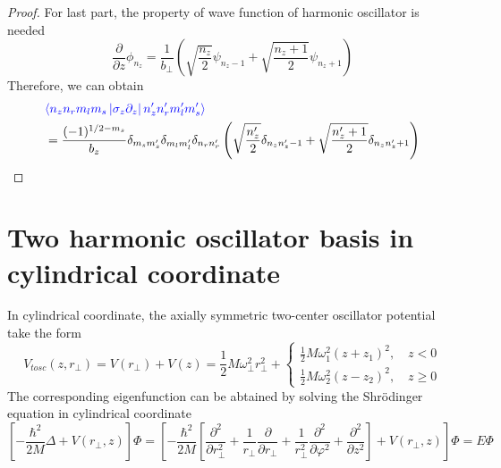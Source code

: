 \begin{proof}
For last part, the property of wave function of harmonic oscillator is needed
\begin{equation}
  \frac{\partial}{\partial z} \phi_{n_z} = \frac{1}{b_\perp} \left( \sqrt{\frac{n_z}{2}}\psi_{n_z -1} + \sqrt{\frac{n_z + 1}{2}} \psi_{n_z + 1} \right)
\end{equation}
Therefore, we can obtain
\begin{equation}
  \begin{aligned}
    &\textcolor{blue}{\left\langle n_z n_r m_l m_s \left| \sigma_z \partial_z \right| n_z^{\prime} n_r^{\prime} m_l^{\prime} m_s^{\prime} \right\rangle}\\
    &=\frac{(-1)^{1 / 2-m_{s}}}{b_{z}} \delta_{m_{s} m_{s}^{\prime}} \delta_{m_{l} m_{l}^{\prime}} \delta_{n_{r} n_{r}^{\prime}}\left(\sqrt{\frac{n_{z}^{\prime}}{2}} \delta_{n_{z} n_{z}^{\prime}-1}+\sqrt{\frac{n_{z}^{\prime}+1}{2}} \delta_{n_{z} n_{z}^{\prime}+1}\right)
  \end{aligned}
\end{equation}
\end{proof}

\section{Two harmonic oscillator basis in cylindrical coordinate}

In cylindrical coordinate, the axially symmetric two-center oscillator potential take the form
\begin{equation}
V_{tosc}(z, r_\perp) = V(r_\perp) + V(z) = \frac{1}{2} M \omega_\perp^2 r_\perp^2 + 
\begin{cases}
  \frac{1}{2} M \omega_1^2(z + z_1)^2, \quad  z<0\\
  \frac{1}{2} M \omega_2^2(z - z_2)^2, \quad  z \geqslant 0
\end{cases}
\end{equation}
The corresponding eigenfunction can be abtained by solving the Shr{\"o}dinger equation in cylindrical coordinate
\begin{equation}
\left[-\frac{\hbar^{2}}{2 M} \Delta+V\left(r_{\perp}, z\right)\right] \Phi=\left[-\frac{\hbar^{2}}{2 M}\left[\frac{\partial^{2}}{\partial r_{\perp}^{2}}+\frac{1}{r_{\perp}} \frac{\partial}{\partial r_{\perp}}+\frac{1}{r_{\perp}^{2}} \frac{\partial^{2}}{\partial \varphi^{2}}+\frac{\partial^{2}}{\partial z^{2}}\right]+V\left(r_{\perp}, z\right)\right] \Phi=E \Phi \label{tc_shrodinger}
\end{equation}

